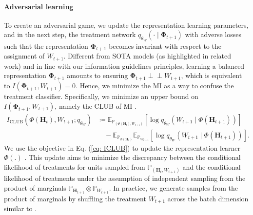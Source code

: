 \documentclass{article}
\newcommand{\indep}{\perp \!\!\! \perp}
\theoremstyle{plain}
\theoremstyle{definition}
\theoremstyle{remark}
\begin{document}
\paragraph{Adversarial learning} To create an adversarial game, we update the representation learning parameters, and in the next step, the treatment network \( q_{\theta_W}(\cdot \mid \mathbf{\Phi}_{t+1}) \) with adverse losses such that the representation \( \mathbf{\Phi}_{t+1} \) becomes invariant with respect to the assignment of \( W_{t+1} \). Different from SOTA models (as highlighted in related work) and in line with our information guidelines principles, learning a balanced representation \( \mathbf{\Phi}_{t+1} \) amounts to ensuring \( \mathbf{\Phi}_{t+1} \indep W_{t+1} \), which is equivalent to \( I(\mathbf{\Phi}_{t+1}, W_{t+1}) = 0 \). Hence, we minimize the MI as a way to confuse the treatment classifier. Specifically, we minimize an upper bound on \( I(\mathbf{\Phi}_{t+1}, W_{t+1}) \), namely the CLUB of MI \citep{cheng2020club}.
\begin{equation}
\begin{aligned}
I_{\text{CLUB}}(\Phi(\mathbf{H}_t), W_{t+1}; q_{\theta_W}) &\coloneqq  \mathbb{E}_{\mathbb{P}_{(\Phi(\mathbf{H}_t), W_{t+1})}} 
\left[ \log q_{\theta_W}(W_{t+1} \mid \Phi(\mathbf{H}_{t+1})) \right] \\
&\quad - \mathbb{E}_{\mathbb{P}_{\Phi(\mathbf{H}_t)}}\mathbb{E}_{\mathbb{P}_{W_{t+1}}} 
\left[ \log q_{\theta_W}(W_{t+1} \mid \Phi(\mathbf{H}_{t+1})) \right].
\end{aligned}
\label{eq: ICLUB}
\end{equation}
We use the objective in Eq. (\ref{eq: ICLUB}) to update the representation learner $\Phi(.)$ \citep{brakel2017learning, DeepInfoMax2019}. This update aims to minimize the discrepancy between the conditional likelihood of treatments for units sampled from $\mathbb{P}_{(\mathbf{H}_t, W_{t+1})}$ and the conditional likelihood of treatments under the assumption of independent sampling from the product of marginals $\mathbb{P}_{\mathbf{H}_{t+1}} \otimes \mathbb{P}_{W_{t+1}}$. In practice, we generate samples from the product of marginals by shuffling the treatment $W_{t+1}$ across the batch dimension similar to \cite{brakel2017learning, DeepInfoMax2019}.
\end{document}
